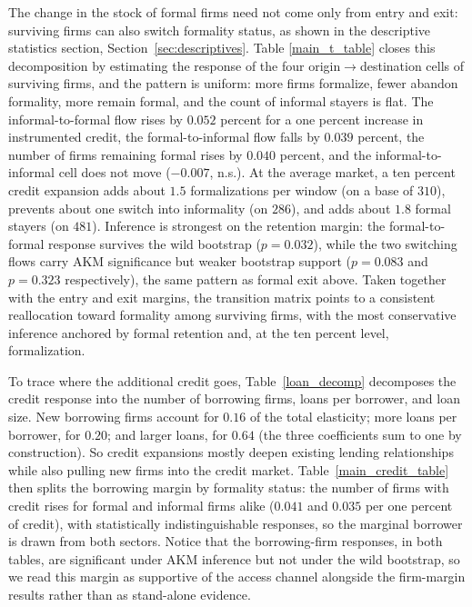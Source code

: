 \documentclass[12pt]{article}
\begin{document}
\begin{table}[H]
    \caption{Shift-Share IV estimates of the effect of bank shocks on the number of firms}
    \label{main_table}
    \centering
    \small
    
\end{table}

The change in the stock of formal firms need not come only from entry and exit: surviving firms can also switch formality status, as shown in the descriptive statistics section, Section~\ref{sec:descriptives}. Table \ref{main_t_table} closes this decomposition by estimating the response of the four origin$\to$destination cells of surviving firms, and the pattern is uniform: more firms formalize, fewer abandon formality, more remain formal, and the count of informal stayers is flat. The informal-to-formal flow rises by $0.052$ percent for a one percent increase in instrumented credit, the formal-to-informal flow falls by $0.039$ percent, the number of firms remaining formal rises by $0.040$ percent, and the informal-to-informal cell does not move ($-0.007$, n.s.). At the average market, a ten percent credit expansion adds about $1.5$ formalizations per window (on a base of $310$), prevents about one switch into informality (on $286$), and adds about $1.8$ formal stayers (on $481$). Inference is strongest on the retention margin: the formal-to-formal response survives the wild bootstrap ($p=0.032$), while the two switching flows carry AKM significance but weaker bootstrap support ($p=0.083$ and $p=0.323$ respectively), the same pattern as formal exit above. Taken together with the entry and exit margins, the transition matrix points to a consistent reallocation toward formality among surviving firms, with the most conservative inference anchored by formal retention and, at the ten percent level, formalization.

\begin{table}[H]
    \caption{Shift-Share IV estimates of the effect of bank shocks on firm transitions}
    \label{main_t_table}
    \centering
    \small
    
\end{table}

To trace where the additional credit goes, Table~\ref{loan_decomp} decomposes the credit response into the number of borrowing firms, loans per borrower, and loan size. New borrowing firms account for $0.16$ of the total elasticity; more loans per borrower, for $0.20$; and larger loans, for $0.64$ (the three coefficients sum to one by construction). So credit expansions mostly deepen existing lending relationships while also pulling new firms into the credit market. Table~\ref{main_credit_table} then splits the borrowing margin by formality status: the number of firms with credit rises for formal and informal firms alike ($0.041$ and $0.035$ per one percent of credit), with statistically indistinguishable responses, so the marginal borrower is drawn from both sectors. Notice that the borrowing-firm responses, in both tables, are significant under AKM inference but not under the wild bootstrap, so we read this margin as supportive of the access channel alongside the firm-margin results rather than as stand-alone evidence.
\end{document}
